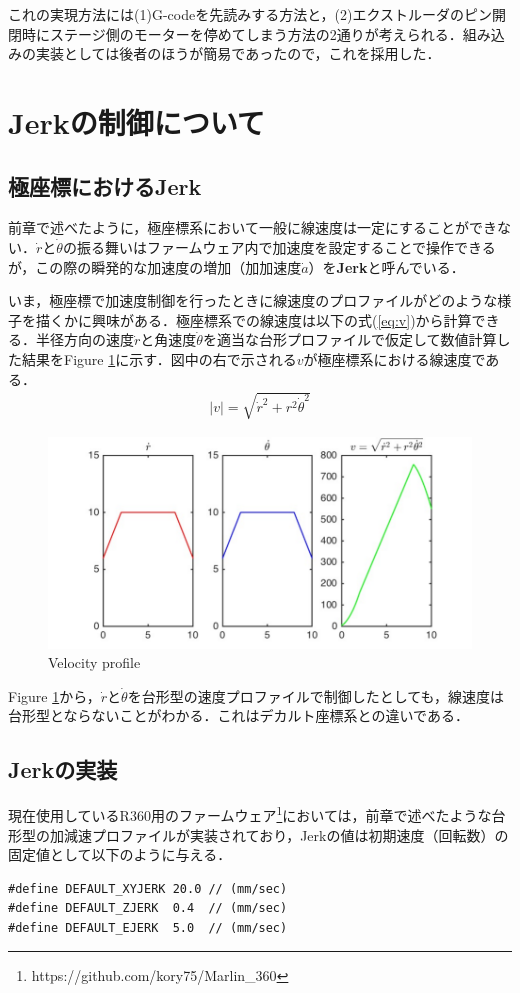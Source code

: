 \documentclass[twocolumn,oneside,a4paper]{article}
\begin{document}
これの実現方法には(1)G-codeを先読みする方法と，(2)エクストルーダのピン開閉時にステージ側のモーターを停めてしまう方法の2通りが考えられる．組み込みの実装としては後者のほうが簡易であったので，これを採用した．

\section{Jerkの制御について}
\subsection{極座標におけるJerk}
前章で述べたように，極座標系において一般に線速度は一定にすることができない．$\dot{r}$と$\dot{\theta}$の振る舞いはファームウェア内で加速度を設定することで操作できるが，この際の瞬発的な加速度の増加（加加速度$\dot{a}$）を{\bf Jerk}と呼んでいる．

いま，極座標で加速度制御を行ったときに線速度のプロファイルがどのような様子を描くかに興味がある．極座標系での線速度は以下の式(\ref{eq:v})から計算できる．半径方向の速度$\dot{r}$と角速度$\dot{\theta}$を適当な台形プロファイルで仮定して数値計算した結果をFigure \ref{fig:jerk}に示す．図中の右で示される$v$が極座標系における線速度である．
\begin{eqnarray}\label{eq:v}
	|v| = \sqrt{ \dot{r}^2+ r^2 \dot{\theta}^2 } 
\end{eqnarray}

\begin{figure}[htbp]
    \includegraphics[bb=0 0 432 216,width=1\columnwidth]{accel2.pdf}
    \caption{Velocity profile}
    \label{fig:jerk}
\end{figure}

Figure \ref{fig:jerk}から，$\dot{r}$と$\dot{\theta}$を台形型の速度プロファイルで制御したとしても，線速度は台形型とならないことがわかる．これはデカルト座標系との違いである．

\subsection{Jerkの実装}
現在使用しているR360用のファームウェア\footnote{https://github.com/kory75/Marlin\_360}においては，前章で述べたような台形型の加減速プロファイルが実装されており，Jerkの値は初期速度（回転数）の固定値として以下のように与える．
{\small
\begin{verbatim}
#define DEFAULT_XYJERK 20.0 // (mm/sec)
#define DEFAULT_ZJERK  0.4  // (mm/sec)
#define DEFAULT_EJERK  5.0  // (mm/sec)
\end{verbatim}}
\end{document}
